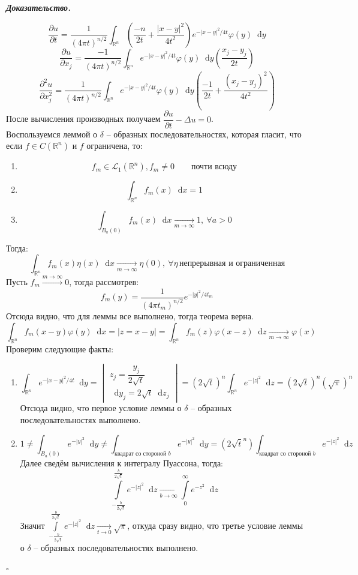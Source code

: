 \documentclass[11pt,a4paper]{report}
\numberwithin{equation}{section}
\numberwithin{figure}{chapter}
\numberwithin{table}{chapter}
\newenvironment{myproof}{%
    \begin{tcolorbox}[mathphysblock,colframe=proofcolor!65,colback=proofcolor!2,boxrule=0.5pt]
    \textit{\textbf{Доказательство.}}\par\smallskip
}{%
    \hfill$\square$
    \end{tcolorbox}
}
\newcommand{\R}{\mathbb{R}}
\renewcommand{\L}{\mathcal{L}}
\newcommand{\p}{\partial}
\newcommand{\dd}{\mathop{}\!\mathrm{d}}
\renewcommand{\phi}{\varphi}
\begin{document}
\begin{myproof}
    \[
   \dfrac{\p u}{\p t} 
   = \dfrac{1}{(4\pi t)^{n/2}} \int_{\R^n} \left( \dfrac{-n}{2t}+\dfrac{|x-y|^2}{4t^2}\right) e^{-|x-y|^2/4t}  \phi(y) \dd y\]
   \[\dfrac{\p u}{\p x_j}=\dfrac{-1}{(4 \pi t )^{n/2}} \int_{\R^n} e^{-|x-y|^2/4t}  \phi(y) \dd y \left( \dfrac{x_j-y_j}{2t}\right)\]
   \[\dfrac{\p^2 u}{\p x_j^2}=\dfrac{1}{(4 \pi t )^{n/2}} \int_{\R^n} e^{-|x-y|^2/4t}  \phi(y) \dd y \left( \dfrac{-1}{2t}+\dfrac{(x_j-y_j)^2}{4t^2}\right)\]
   После вычисления производных получаем $\dfrac{\p u}{\p t} - \Delta u = 0$. \\
   Воспользуемся леммой о $\delta$ -- образных последовательностях, которая гласит, что если $f\in C(\R^n)$ и $f$ ограничена, то:
\begin{enumerate}
    \item \[f_m \in \L_1(\R^n), f_m \neq 0 \qquad \text{почти всюду}\]
    \item   \[\int_{\R^n}f_m(x)\dd x = 1\]
    \item \[\int_{B_a(0)}f_m (x)\dd x \xrightarrow[m\to\infty]{}1, \ \forall a>0\]
\end{enumerate}
Тогда:
\[\int_{\R^n}f_m(x)\eta(x)\dd x \xrightarrow[m\to\infty]{}\eta(0), \ \forall \eta\, \text{непрерывная и ограниченная}\] 
Пусть $f_m \xrightarrow{m\to\infty}{}0$, тогда рассмотрев:
\[f_m(y)=\dfrac{1}{(4\pi t_m)^{n/2}}e^{-|y|^2/4t_m}\]
Отсюда видно, что для леммы все выполнено, тогда теорема верна.
\[\int_{\R^n}f_m(x-y)\varphi(y)\dd x =|z=x-y|=\int_{\R^n} f_m(z)\varphi(x-z)\dd z \xrightarrow[m\to\infty]{}\varphi(x)
\]
Проверим следующие факты:
\begin{enumerate}
    \item \[\int_{\R^n}e^{-|x-y|^2/4t}\dd y =\begin{vmatrix}
        z_j=\dfrac{y_j}{2\sqrt{t}}\\
        \dd y_j = 2\sqrt{t}\dd z_j  
    \end{vmatrix}=(2\sqrt{t})^n \int_{\R^n} e^{-|z|^2}\dd z=(2\sqrt{t})^n\left(\sqrt{\pi}\right)^n\]
    Отсюда видно, что первое условие леммы о $\delta$ -- образных последовательностях выполнено.
    \item \[1\neq \int_{B_a(0)}e^{-|y|^2}\dd y \neq \int_{\text{квадрат со стороной }b}e^{-|y|^2}\dd y=(2\sqrt{t}^n)\int_{\text{квадрат со стороной }b}e^{-|z|^2}\dd z\]
    Далее сведём вычисления к интегралу Пуассона, тогда:
    \[\int\limits_{-\frac{b}{2\sqrt{t}}}^{\frac{b}{2\sqrt{t}}}e^{-|z|^2}\dd z \xrightarrow[b\to\infty]{}\int\limits_{0}^{\infty}e^{-z^2}\dd z\]
    Значит $\int\limits_{-\frac{b}{2\sqrt{t}}}^{\frac{b}{2\sqrt{t}}}e^{-|z|^2}\dd z \xrightarrow[t\to0]{}  \sqrt{\pi}$, откуда сразу видно, что третье условие леммы о $\delta$ -- образных последовательностях выполнено.
\end{enumerate}
\end{myproof}
\end{document}
